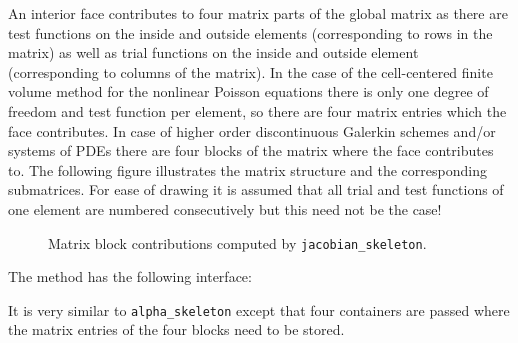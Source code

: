 \documentclass[a4paper,12pt]{article}
\begin{document}
An interior face contributes to four matrix parts of the global matrix as there
are test functions on the inside and outside elements (corresponding to rows in the
matrix) as well as trial functions on the inside and outside element (corresponding to
columns of the matrix). In the case of the cell-centered finite volume method for
the nonlinear Poisson equations there is only one degree of freedom and test function per
element, so there are four matrix entries which the face contributes. In case of higher
order discontinuous Galerkin schemes and/or systems of PDEs there are four blocks
of the matrix where the face contributes to. The following figure illustrates
the matrix structure and the corresponding submatrices. For ease of drawing it is
assumed that all trial and test functions of one element are numbered consecutively
but this need not be the case!
\begin{figure}[h]
\begin{center}
\hspace{0.1\textwidth}
\end{center}
\caption{Matrix block contributions computed by \lstinline{jacobian_skeleton}.}
\label{fig:MatrixBlocks}
\end{figure}

The method has the following interface:

It is very similar to \lstinline{alpha_skeleton} except that four containers
are passed where the matrix entries of the four blocks need to be stored.
\end{document}
